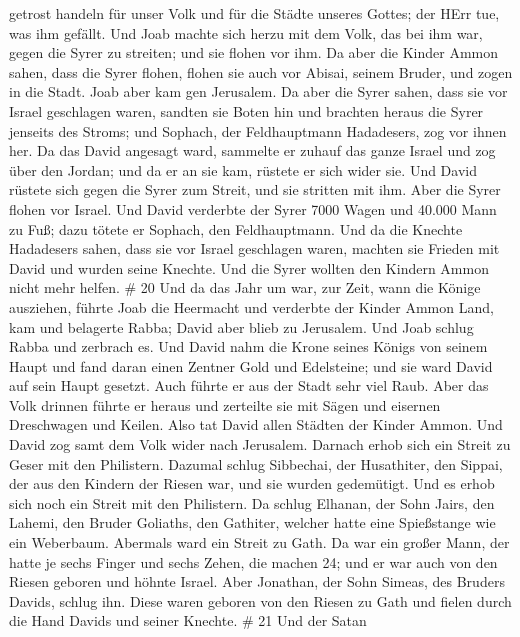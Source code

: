 getrost handeln für unser Volk und für die Städte unseres Gottes; der
HErr tue, was ihm gefällt.  Und Joab machte sich herzu mit
dem Volk, das bei ihm war, gegen die Syrer zu streiten; und sie flohen
vor ihm.  Da aber die Kinder Ammon sahen, dass die Syrer
flohen, flohen sie auch vor Abisai, seinem Bruder, und zogen in die
Stadt. Joab aber kam gen Jerusalem.  Da aber die Syrer
sahen, dass sie vor Israel geschlagen waren, sandten sie Boten hin und
brachten heraus die Syrer jenseits des Stroms; und Sophach, der
Feldhauptmann Hadadesers, zog vor ihnen her.  Da das David
angesagt ward, sammelte er zuhauf das ganze Israel und zog über den
Jordan; und da er an sie kam, rüstete er sich wider sie. Und David
rüstete sich gegen die Syrer zum Streit, und sie stritten mit ihm.
 Aber die Syrer flohen vor Israel. Und David verderbte der
Syrer 7000 Wagen und 40.000 Mann zu Fuß; dazu tötete er Sophach, den
Feldhauptmann.  Und da die Knechte Hadadesers sahen, dass
sie vor Israel geschlagen waren, machten sie Frieden mit David und
wurden seine Knechte. Und die Syrer wollten den Kindern Ammon nicht mehr
helfen. \# 20  Und da das Jahr um war, zur Zeit, wann die
Könige ausziehen, führte Joab die Heermacht und verderbte der Kinder
Ammon Land, kam und belagerte Rabba; David aber blieb zu Jerusalem. Und
Joab schlug Rabba und zerbrach es.  Und David nahm die Krone
seines Königs von seinem Haupt und fand daran einen Zentner Gold und
Edelsteine; und sie ward David auf sein Haupt gesetzt. Auch führte er
aus der Stadt sehr viel Raub.  Aber das Volk drinnen führte
er heraus und zerteilte sie mit Sägen und eisernen Dreschwagen und
Keilen. Also tat David allen Städten der Kinder Ammon. Und David zog
samt dem Volk wider nach Jerusalem.  Darnach erhob sich ein
Streit zu Geser mit den Philistern. Dazumal schlug Sibbechai, der
Husathiter, den Sippai, der aus den Kindern der Riesen war, und sie
wurden gedemütigt.  Und es erhob sich noch ein Streit mit
den Philistern. Da schlug Elhanan, der Sohn Jairs, den Lahemi, den
Bruder Goliaths, den Gathiter, welcher hatte eine Spießstange wie ein
Weberbaum.  Abermals ward ein Streit zu Gath. Da war ein
großer Mann, der hatte je sechs Finger und sechs Zehen, die machen 24;
und er war auch von den Riesen geboren  und höhnte Israel.
Aber Jonathan, der Sohn Simeas, des Bruders Davids, schlug ihn.
 Diese waren geboren von den Riesen zu Gath und fielen durch
die Hand Davids und seiner Knechte. \# 21  Und der Satan
